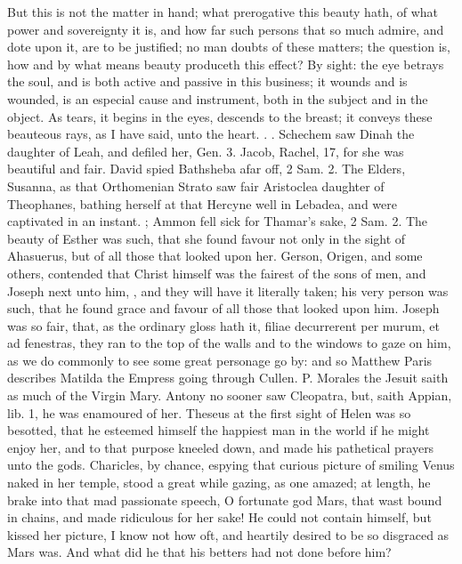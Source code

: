 But this is not the matter in hand; what prerogative this beauty hath,
of what power and sovereignty it is, and how far such persons that so
much admire, and dote upon it, are to be justified; no man doubts of
these matters; the question is, how and by what means beauty produceth
this effect? By sight: the eye betrays the soul, and is both active and
passive in this business; it wounds and is wounded, is an especial
cause and instrument, both in the subject and in the object. As
tears, it begins in the eyes, descends to the breast; it conveys these
beauteous rays, as I have said, unto the heart. .
. Schechem saw Dinah the daughter
of Leah, and defiled her, Gen.  3. Jacob, Rachel,  17, for
she was beautiful and fair. David spied Bathsheba afar off, 2 Sam. 
2. The Elders, Susanna, as that Orthomenian Strato saw fair
Aristoclea daughter of Theophanes, bathing herself at that Hercyne well
in Lebadea, and were captivated in an instant. ; Ammon fell sick for Thamar's sake, 2 Sam.
 2. The beauty of Esther was such, that she found favour not only
in the sight of Ahasuerus, but of all those that looked upon her.
Gerson, Origen, and some others, contended that Christ himself was the
fairest of the sons of men, and Joseph next unto him, , and they will have it literally taken; his very person
was such, that he found grace and favour of all those that looked upon
him. Joseph was so fair, that, as the ordinary gloss hath it, filiae
decurrerent per murum, et ad fenestras, they ran to the top of the
walls and to the windows to gaze on him, as we do commonly to see some
great personage go by: and so Matthew Paris describes Matilda the
Empress going through Cullen. P. Morales the Jesuit saith as much
of the Virgin Mary. Antony no sooner saw Cleopatra, but, saith Appian,
lib. 1, he was enamoured of her. Theseus at the first sight of
Helen was so besotted, that he esteemed himself the happiest man in the
world if he might enjoy her, and to that purpose kneeled down, and made
his pathetical prayers unto the gods. Charicles, by chance,
espying that curious picture of smiling Venus naked in her temple,
stood a great while gazing, as one amazed; at length, he brake into
that mad passionate speech, O fortunate god Mars, that wast bound in
chains, and made ridiculous for her sake! He could not contain himself,
but kissed her picture, I know not how oft, and heartily desired to be
so disgraced as Mars was. And what did he that his betters had not done
before him?

